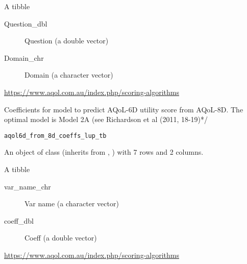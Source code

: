 \documentclass[a4paper]{book}
\begin{document}
%
\begin{Details}\relax
A tibble

\begin{description}

\item[Question\_dbl] Question (a double vector)
\item[Domain\_chr] Domain (a character vector)

\end{description}

\end{Details}
%
\begin{Source}\relax
\url{https://www.aqol.com.au/index.php/scoring-algorithms}
\end{Source}
%
\begin{Description}\relax
Coefficients for model to predict AQoL-6D utility score from AQoL-8D. The optimal model is Model 2A (see Richardson et al (2011, 18-19)*/
\end{Description}
%
\begin{Usage}
\begin{verbatim}
aqol6d_from_8d_coeffs_lup_tb
\end{verbatim}
\end{Usage}
%
\begin{Format}
An object of class  (inherits from , ) with 7 rows and 2 columns.
\end{Format}
%
\begin{Details}\relax
A tibble

\begin{description}

\item[var\_name\_chr] Var name (a character vector)
\item[coeff\_dbl] Coeff (a double vector)

\end{description}

\end{Details}
%
\begin{Source}\relax
\url{https://www.aqol.com.au/index.php/scoring-algorithms}
\end{Source}
\end{document}
